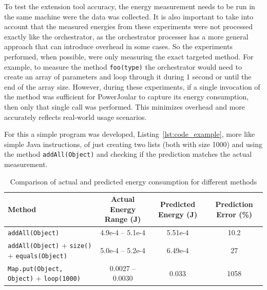 To test the extension tool accuracy, the energy measurement needs to be run in the same machine were the data was collected. It is also important to take into account that the measured energies from these experiments were not processed exactly like the orchestrator, as the orchestrator processer has a more general approach that can introduce overhead in some cases. So the experiments performed, when possible, were only measuring the exact targeted method. For example, to measure the method \texttt{foo(type)} the orchestrator would need to create an array of parameters and loop through it during 1 second or until the end of the array size. However, during these experiments, if a single invocation of the method was sufficient for PowerJoular to capture its energy consumption, then only that single call was performed. This minimizes overhead and more accurately reflects real-world usage scenarios.

For this a simple program was developed, Listing~\ref{lst:code_example}, more like simple Java instructions, of just creating two lists (both with size 1000) and using the method \texttt{addAll(Object)} and checking if the prediction matches the actual measurement.

\begin{table}[htbp]
  \centering
  \label{tab:energy_comparison}
  \footnotesize
  \begin{tabular}{>{\raggedright\arraybackslash}p{4cm}ccc}
    \toprule
    Method & Actual Energy Range (J) & Predicted Energy (J) & Prediction Error (\%) \\
    \midrule
    \texttt{addAll(Object)} & 4.9e-4 -- 5.1e-4 & 5.51e-4 & 10.2 \\
    \midrule
    \texttt{addAll(Object)} + \texttt{size()} + \texttt{equals(Object)} & 5.0e-4 -- 5.2e-4 & 6.49e-4 & 27 \\
    \midrule
    \texttt{Map.put(Object, Object)} + \texttt{loop(1000)} & 0.0027 -- 0.0030 & 0.033 &  1058 \\
    \bottomrule
  \end{tabular}
  \vspace{0.5em}
  \caption{Comparison of actual and predicted energy consumption for different methods}
\end{table}


